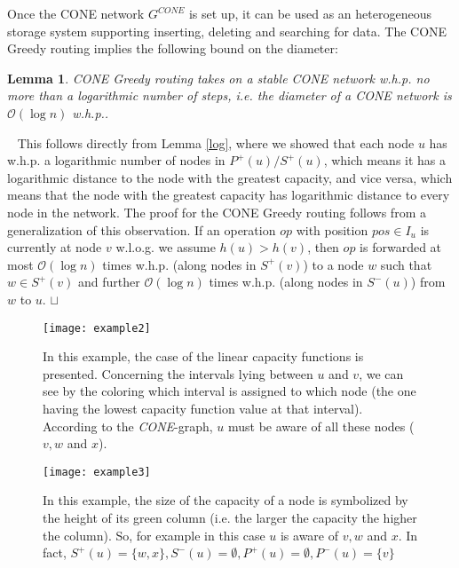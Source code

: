 \documentclass[11pt]{article}
\newtheorem{lemma}[theorem]{Lemma}
\newcommand{\sq}{\hbox{\rlap{$\sqcap$}$\sqcup$}}
\newcommand{\qed}{\hspace*{\fill}\sq}
\newenvironment{proof}{\noindent {\bf Proof.}\ }{\qed\par\vskip 4mm\par}
\begin{document}
Once the CONE network $G^{CONE}$ is set up, it can be used as an heterogeneous storage system supporting inserting, deleting and searching for data.
The CONE Greedy routing implies the following bound on the diameter:

\begin{lemma}\label{lem:routing}
CONE Greedy routing takes on a stable CONE network w.h.p. no more than a logarithmic number of steps, i.e. the diameter of a CONE network is $\mathcal O(\log n)$ w.h.p..
\end{lemma}

\begin{proof}
This follows directly from Lemma \ref{log}, where we showed that each node $u$ has w.h.p. a logarithmic number of nodes in $ P^+(u)/ S^+(u)$, which means it has a logarithmic distance to the node with the greatest capacity, and vice versa, which means that the node with the greatest capacity has logarithmic distance to every node in the network. The proof for the CONE Greedy routing follows from a generalization of this observation. If an operation $op$ with position $pos \in I_u$ is currently at node $v$ w.l.o.g. we assume $h(u)>h(v)$, then $op$ is forwarded at most $\mathcal O(\log n)$ times w.h.p. (along nodes in $ S^+(v)$) to a node $w$ such that $w\in  S^+(v)$  and further $\mathcal O(\log n)$ times w.h.p. (along nodes in $ S^-(u)$) from $w$ to $u$.
\end{proof}

\begin{figure}[htb]
\caption{In this example, the case of the linear capacity functions is presented.
Concerning the intervals lying between $u$ and $v$,
we can see by the coloring which interval is assigned to which node (the one having the lowest capacity function value at that interval). According to the \emph{CONE}-graph, $u$
must be aware of all these nodes ($v,w$ and $x$).}

\texttt{[image: example2]}\label{example}
\end{figure}

\begin{figure}[htb]

\caption{In this example, the size of the capacity of a node is symbolized by the height of its green column (i.e. the larger the capacity the higher the column). So, for example in this case $u$ is aware of $v,w$ and $x$. In fact, $S^+(u)=\{w,x\},S^-(u)=\emptyset,P^+(u)=\emptyset, P^-(u)=\{v \}$   }

\texttt{[image: example3]}\label{example3}
\end{figure}
\end{document}

